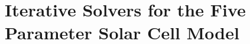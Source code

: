 \chapter{Iterative Solvers for the Five Parameter Solar Cell Model}\label{appendix:iterative_solvers}

